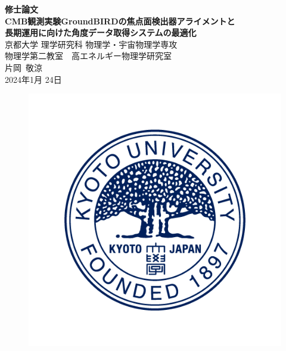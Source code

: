 \thispagestyle{empty}
\begin{center}
\vspace*{1cm}
{\LARGE {\bf {\rm 修士論文} } }\\
\vspace*{1.5cm}
\setlength{\baselineskip}{1cm}
{\Large {\bf {\rm CMB観測実験GroundBIRDの焦点面検出器アライメントと\\
長期運用に向けた角度データ取得システムの最適化
}}}\\
\vspace{1.5cm}
{\Large 京都大学 理学研究科 物理学・宇宙物理学専攻}\\
{\Large 物理学第二教室　高エネルギー物理学研究室}\\
\vspace{1.5cm}
{\Large 片岡~敬涼}\\
\vspace{0.5cm}
{\Large 2024年1月 24日}
\begin{figure}[h]
 \centering
 \includegraphics[width=0.6\columnwidth]{0_title/E-C.png}
\end{figure}



\end{center}
